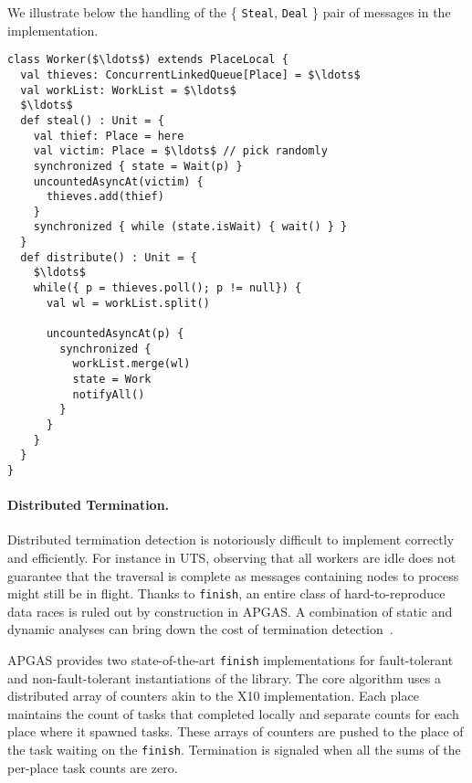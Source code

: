 We illustrate below the handling of the \{ \lstinline{Steal}, \lstinline{Deal} \} pair of messages in the \apgas implementation.
\begin{lstlisting}
class Worker($\ldots$) extends PlaceLocal {
  val thieves: ConcurrentLinkedQueue[Place] = $\ldots$
  val workList: WorkList = $\ldots$
  $\ldots$
  def steal() : Unit = {
    val thief: Place = here
    val victim: Place = $\ldots$ // pick randomly
    synchronized { state = Wait(p) }
    uncountedAsyncAt(victim) {
      thieves.add(thief)
    }
    synchronized { while (state.isWait) { wait() } }
  }
  def distribute() : Unit = {
    $\ldots$ 
    while({ p = thieves.poll(); p != null}) {
      val wl = workList.split()

      uncountedAsyncAt(p) {
        synchronized {
          workList.merge(wl)
          state = Work
          notifyAll()
        }
      }
    }
  }
}
\end{lstlisting}

\paragraph{Distributed Termination.} Distributed termination detection is notoriously difficult to implement correctly and efficiently.
For instance in UTS, observing that all workers are idle does not guarantee that the traversal is complete as messages containing nodes to process might still be in flight. Thanks to \lstinline{finish}, an entire class of hard-to-reproduce data races is ruled out by construction in APGAS.
A combination of static and dynamic analyses can bring down the cost of termination detection~\cite{TardieuETAL14X10ApgasAtPetascale}. 

APGAS provides two state-of-the-art \lstinline{finish} implementations for fault-tolerant and non-fault-tolerant instantiations of the library. The core algorithm uses a distributed array of counters akin to the X10 implementation. Each place maintains the count of tasks that completed locally and separate counts for each place where it spawned tasks. These arrays of counters are pushed to the place of the task waiting on the \lstinline{finish}. Termination is signaled when all the sums of the per-place task counts are zero.


% 
% 
% 
% 
% 


